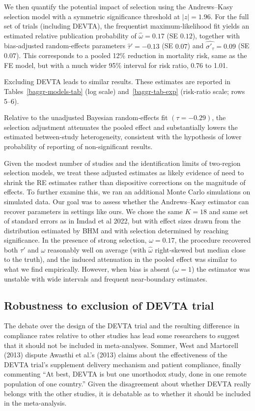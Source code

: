 \documentclass[12pt]{article}
\begin{document}
We then quantify the potential impact of selection using the Andrews–Kasy selection model with a symmetric significance threshold at \(|z|=1.96\). For the full set of trials (including DEVTA), the frequentist maximum‐likelihood fit yields an estimated relative publication probability of \(\hat\omega=0.17\) (SE \(0.12\)), together with bias‐adjusted random‐effects parameters \(\hat\tau'=-0.13\) (SE \(0.07\)) and \(\widehat{\sigma'_{\tau}}=0.09\) (SE \(0.07\)). This corresponds to a pooled 12\% reduction in mortality risk, same as the FE model, but with a much wider 95\% interval for risk ratio, 0.76 to 1.01.

Excluding DEVTA leads to similar results. These estimates are reported in Tables~\ref{baggr-models-tab} (log scale) and~\ref{baggr-tab-exp} (risk‐ratio scale; rows 5–6).

Relative to the unadjusted Bayesian random‐effects fit $(\tau =  -0.29)$, the selection adjustment attenuates the pooled effect and substantially lowers the estimated between‐study heterogeneity, consistent with the hypothesis of lower probability of reporting of non-significant results. 

Given the modest number of studies and the identification limits of two‐region selection models, we treat these adjusted estimates as likely evidence of need to shrink the RE estimates rather than dispositive corrections on the magnitude of effects. To further examine this, we ran an additional Monte Carlo simulations on simulated data. Our 
goal was to assess whether the Andrews–Kasy estimator can recover parameters in settings like ours. We chose the same $K = 18$ and same set of standard errors as in Imdad et al 2022, but with effect sizes drawn from the distribution estimated by BHM and with selection determined by reaching significance. In the presence of strong selection, $\omega = 0.17$, the procedure recovered both \(\tau'\) and \(\omega\) reasonably well on average (with \(\hat\omega\) right‐skewed but median close to the truth), and the induced attenuation in the pooled effect was similar to what we find empirically. However, when bias is absent (\(\omega=1\)) the estimator was unstable with wide intervals and frequent near‐boundary estimates.


\subsection{Robustness to exclusion of DEVTA trial}

The debate over the design of the DEVTA trial and the resulting difference in compliance rates relative to other studies has lead some researchers to suggest that it should not be included in meta-analyses. Sommer, West and Martorell (2013) dispute Awasthi et al.'s (2013) claims about the effectiveness of the DEVTA trial's supplement delivery mechanism and patient compliance, finally commenting ``At best, DEVTA is but one unorthodox study, done in one remote population of one country.'' Given the disagreement about whether DEVTA really belongs with the other studies, it is debatable as to whether it should be included in the meta-analysis.
\end{document}
